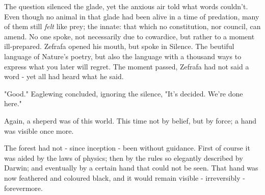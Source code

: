 




The question silenced the glade, yet the anxious air told what words couldn't. Even though no animal in that glade had been alive in a time of predation, many of them still \textit{felt} like prey; the innate: that which no constitution, nor council, can amend.
No one spoke, not necessarily due to cowardice, but rather to a moment ill-prepared.
  Zefrafa opened his mouth, but spoke in Silence. 
  The beutiful language of Nature's poetry, but also the language with a thousand ways to express what you later will regret. 
The moment passed, Zefrafa had not said a word - yet all had heard what he said. 

"Good." Eaglewing concluded, ignoring the silence, "It's decided. We're done here."  %

Again, a sheperd was of this world. This time not by belief, but by force; a hand was visible once more.

The forest had not - since inception - been without guidance. First of course it was aided by the laws of physics; then by the rules so elegantly described by Darwin; and eventually by a certain hand that could not be seen. That hand was now feathered and coloured black, and it would remain visible - irreversibly - forevermore.




